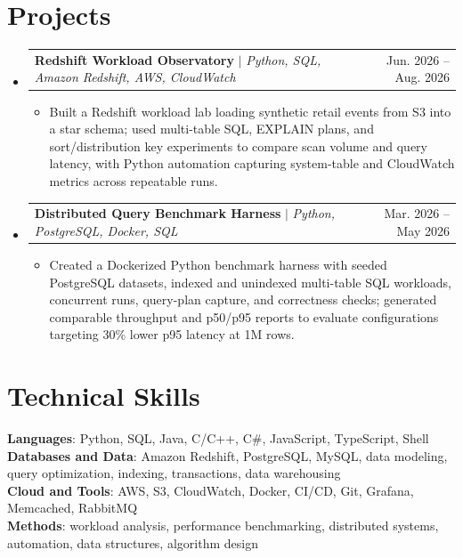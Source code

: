 \documentclass[letterpaper,11pt]{article}
\makeatletter
\newcommand{\resumeItem}[1]{
  \item\small{
    {#1 \vspace{-2pt}}
  }
}
\newcommand{\resumeProjectHeading}[2]{
    \item
    \begin{tabular*}{0.97\textwidth}{l@{\extracolsep{\fill}}r}
      \small#1 & #2 \\
    \end{tabular*}\vspace{-7pt}
}
\newcommand{\resumeSubHeadingListStart}{\begin{itemize}[leftmargin=0.15in, label={}]}
\newcommand{\resumeSubHeadingListEnd}{\end{itemize}}
\newcommand{\resumeItemListStart}{\begin{itemize}}
\newcommand{\resumeItemListEnd}{\end{itemize}\vspace{-5pt}}
\makeatother
\begin{document}
\section{Projects}
\resumeSubHeadingListStart
\resumeProjectHeading
{\textbf{Redshift Workload Observatory} $|$ \emph{Python, SQL, Amazon Redshift, AWS, CloudWatch}}{Jun. 2026 -- Aug. 2026}
\resumeItemListStart
\resumeItem{Built a Redshift workload lab loading synthetic retail events from S3 into a star schema; used multi-table SQL, EXPLAIN plans, and sort/distribution key experiments to compare scan volume and query latency, with Python automation capturing system-table and CloudWatch metrics across repeatable runs.}
\resumeItemListEnd
\resumeProjectHeading
{\textbf{Distributed Query Benchmark Harness} $|$ \emph{Python, PostgreSQL, Docker, SQL}}{Mar. 2026 -- May 2026}
\resumeItemListStart
\resumeItem{Created a Dockerized Python benchmark harness with seeded PostgreSQL datasets, indexed and unindexed multi-table SQL workloads, concurrent runs, query-plan capture, and correctness checks; generated comparable throughput and p50/p95 reports to evaluate configurations targeting 30\% lower p95 latency at 1M rows.}
\resumeItemListEnd
\resumeSubHeadingListEnd


\section{Technical Skills}
\begin{itemize}[leftmargin=0.15in, label={}]
  \small{\item{
        \textbf{Languages}{: Python, SQL, Java, C/C++, C\#, JavaScript, TypeScript, Shell} \\
        \textbf{Databases and Data}{: Amazon Redshift, PostgreSQL, MySQL, data modeling, query optimization, indexing, transactions, data warehousing} \\
        \textbf{Cloud and Tools}{: AWS, S3, CloudWatch, Docker, CI/CD, Git, Grafana, Memcached, RabbitMQ} \\
        \textbf{Methods}{: workload analysis, performance benchmarking, distributed systems, automation, data structures, algorithm design}
        }}
\end{itemize}


\end{document}
